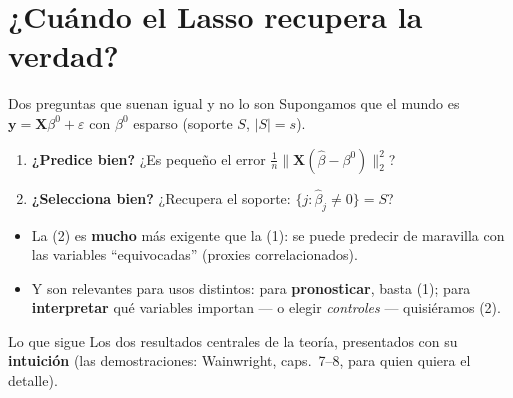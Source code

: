 \documentclass{beamer}
\newcommand{\1}{\mathbb{I}}
\begin{document}
\section{¿Cuándo el Lasso recupera la verdad?}
\begin{frame}[noframenumbering]
\tableofcontents[currentsection]
\end{frame}

\begin{frame}{Dos preguntas que suenan igual y no lo son}
\small
Supongamos que el mundo es $\mathbf{y} = \mathbf{X}\beta^0 + \varepsilon$ con $\beta^0$ esparso (soporte $S$, $|S| = s$).
\pause

\vspace{0.2cm}
\begin{enumerate}\itemsep6pt
  \item \textbf{¿Predice bien?} ¿Es pequeño el error $\tfrac{1}{n}\|\mathbf{X}(\hat{\beta} - \beta^0)\|_2^2$? \pause
  \item \textbf{¿Selecciona bien?} ¿Recupera el soporte: $\{j : \hat{\beta}_j \neq 0\} = S$? \pause
\end{enumerate}

\vspace{0.2cm}
\begin{itemize}\itemsep5pt
  \item La (2) es \textbf{mucho} más exigente que la (1): se puede predecir de maravilla con las variables ``equivocadas'' (proxies correlacionados).
  \item Y son relevantes para usos distintos: para \textbf{pronosticar}, basta (1); para \textbf{interpretar} qué variables importan --- o elegir \emph{controles} --- quisiéramos (2).
\end{itemize}
\pause

\begin{block}{Lo que sigue}
Los dos resultados centrales de la teoría, presentados con su \textbf{intuición} (las demostraciones: Wainwright, caps.\ 7--8, para quien quiera el detalle).
\end{block}
\end{frame}
\end{document}
